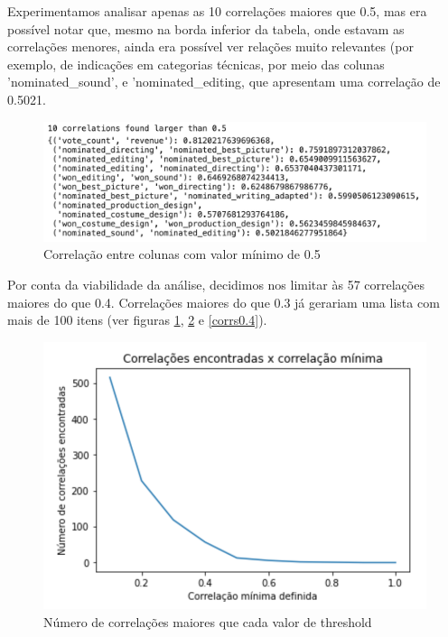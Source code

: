             Experimentamos analisar apenas as 10 correlações maiores que 0.5, mas era possível notar que, mesmo na borda inferior da tabela, onde estavam as correlações menores, ainda era possível ver relações muito relevantes (por exemplo, de indicações em categorias técnicas, por meio das colunas 'nominated\_sound', e 'nominated\_editing, que apresentam uma correlação de 0.5021.\par

            \begin{figure}[htb]
            	\caption{\label{corrs0.5}Correlação entre colunas com valor mínimo de 0.5}
            	\begin{center}
            		\includegraphics[scale=0.7]{corrs0.5.png}
            	\end{center}
            \end{figure}

            Por conta da viabilidade da análise, decidimos nos limitar às 57 correlações maiores do que 0.4. Correlações maiores do que 0.3 já gerariam uma lista com mais de 100 itens (ver figuras \ref{corrs0.5}, \ref{corrs_graph} e \ref{corrs0.4}). \par

            \begin{figure}[htb]
            	\caption{\label{corrs_graph}Número de correlações maiores que cada valor de threshold}
            	\begin{center}
            		\includegraphics[scale=0.8]{corrs_graph.png}
            	\end{center}
            \end{figure}

